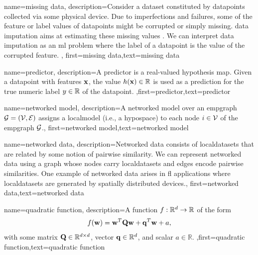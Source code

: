 {name={missing data},
	description={Consider a \gls{dataset} constituted by \gls{datapoint}s collected via 
		some physical \gls{device}. Due to imperfections and failures, some of the \gls{feature} 
		or \gls{label} values of \gls{datapoint}s might be corrupted or simply missing. 
		\Gls{data} imputation aims at estimating these missing values \cite{Abayomi2008DiagnosticsFM}. 
		We can interpret \gls{data} imputation as an \gls{ml} problem where the \gls{label} of a \gls{datapoint} is 
		the value of the corrupted \gls{feature}. },
	first={missing data},text={missing data}  
}


{name={predictor},
	description={A predictor is a real-valued \gls{hypothesis} map. 
		Given a \gls{datapoint} with \gls{feature}s ${\bf x}$, the value 
		$h({\bf x}) \in \mathbb{R}$ is used as a \gls{prediction} for the true 
		numeric \gls{label} $y \in \mathbb{R}$ of the \gls{datapoint}. },first={predictor},text={predictor}  
}

{name={networked model},
  description={A networked \gls{model} over an \gls{empgraph} $\mathcal{G} = \left( \mathcal{V},\mathcal{E} \right)$ assigns 
   a \gls{localmodel} (i.e., a \gls{hypospace}) to each node $i \in \mathcal{V}$ of the \gls{empgraph} $\mathcal{G}$.}, 
   first={networked model},text={networked model}  
}


{
	name={networked data},
	description={Networked \gls{data} consists of \gls{localdataset}s 
	that are related by some notion of pairwise similarity. We can represent networked 
	\gls{data} using a \gls{graph} whose nodes carry \gls{localdataset}s and edges encode 
	pairwise similarities. One example of networked \gls{data} arises in \gls{fl} applications 
	where \gls{localdataset}s are generated by spatially distributed \gls{device}s.}, 
	first={networked data},text={networked data}  
}


{name={quadratic function},
	description={A function $f: \mathbb{R}^{d} \rightarrow \mathbb{R}$ of the form 
	$$f({\bf w}) =  {\bf w}^{T} \mathbf{Q} \mathbf{w} + \mathbf{q}^{T} {\bf w}+a,$$ with 
	some matrix $\mathbf{Q} \in \mathbb{R}^{d \times d}$, vector ${\bf q} \in \mathbb{R}^{d}$, 
	and scalar $a \in \mathbb{R}$.  },first={quadratic function},text={quadratic function}  
}


